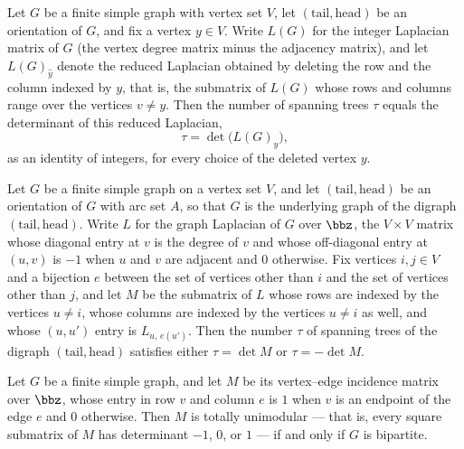 \begin{theorem}
\label{CycleSpace.tau_eq_det_lapMatrix_deleteRowCol}
\leanok
{}
Let $G$ be a finite simple graph with vertex set $V$, let $(\mathrm{tail},
\mathrm{head})$ be an orientation of $G$, and fix a vertex $y \in V$. Write $L(G)$ for
the integer Laplacian matrix of $G$ (the vertex degree matrix minus the adjacency
matrix), and let $L(G)_{\widehat{y}}$ denote the reduced Laplacian obtained by deleting
the row and the column indexed by $y$, that is, the submatrix of $L(G)$ whose rows and
columns range over the vertices $v \neq y$. Then the number of spanning trees $\tau$
equals the determinant of this reduced Laplacian, \[ \tau =
\det\big(L(G)_{\widehat{y}}\big), \] as an identity of integers, for every choice of the
deleted vertex $y$.
\end{theorem}

\begin{theorem}
\label{CycleSpace.tau_eq_lapMatrix_cofactor}
\leanok
{}
Let $G$ be a finite simple graph on a vertex set $V$, and let $(\mathrm{tail},
\mathrm{head})$ be an orientation of $G$ with arc set $A$, so that $G$ is the underlying
graph of the digraph $(\mathrm{tail}, \mathrm{head})$. Write $L$ for the graph Laplacian
of $G$ over $\bbz$, the $V \times V$ matrix whose diagonal entry at $v$ is the degree of
$v$ and whose off-diagonal entry at $(u,v)$ is $-1$ when $u$ and $v$ are adjacent and
$0$ otherwise. Fix vertices $i, j \in V$ and a bijection $e$ between the set of vertices
other than $i$ and the set of vertices other than $j$, and let $M$ be the submatrix of
$L$ whose rows are indexed by the vertices $u \neq i$, whose columns are indexed by the
vertices $u \neq i$ as well, and whose $(u, u')$ entry is $L_{u,\, e(u')}$. Then the
number $\tau$ of spanning trees of the digraph $(\mathrm{tail}, \mathrm{head})$
satisfies either $\tau = \det M$ or $\tau = -\det M$.
\end{theorem}

\begin{theorem}
\label{CycleSpace.incMatrix_isTotallyUnimodular_iff_isBipartite}
\leanok
Let $G$ be a finite simple graph, and let $M$ be its vertex–edge incidence matrix over
$\bbz$, whose entry in row $v$ and column $e$ is $1$ when $v$ is an endpoint of the edge
$e$ and $0$ otherwise. Then $M$ is totally unimodular — that is, every square submatrix
of $M$ has determinant $-1$, $0$, or $1$ — if and only if $G$ is bipartite.
\end{theorem}

